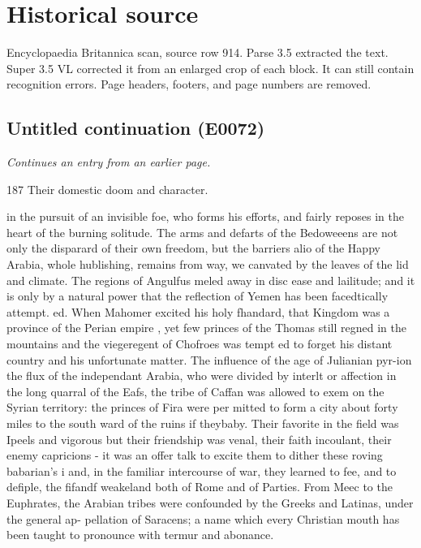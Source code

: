 \documentclass{article}
\begin{document}
\section*{Historical source}
Encyclopaedia Britannica scan, source row 914. Parse 3.5 extracted the text. Super 3.5 VL corrected it from an enlarged crop of each block. It can still contain recognition errors.
Page headers, footers, and page numbers are removed.

\subsection*{Untitled continuation (E0072)}
\textit{Continues an entry from an earlier page.}

187 Their domestic doom and character.

in the pursuit of an invisible foe, who forms his efforts, and fairly reposes in the heart of the burning solitude. The arms and defarts of the Bedoweeens are not only the disparard of their own freedom, but the barriers alio of the Happy Arabia, whole hublishing, remains from way, we canvated by the leaves of the lid and climate. The regions of Angulfus meled away in disc ease and lailitude; and it is only by a natural power that the reflection of Yemen has been facedtically attempt. ed. When Mahomer excited his holy fhandard, that Kingdom was a province of the Perian empire , yet few princes of the Thomas still regned in the mountains and the viegeregent of Chofroes was tempt ed to forget his distant country and his unfortunate matter. The influence of the age of Julianian pyr-ion the flux of the independant Arabia, who were divided by interlt or affection in the long quarral of the Eafs, the tribe of Caffan was allowed to exem on the Syrian territory: the princes of Fira were per mitted to form a city about forty miles to the south ward of the ruins if theybaby. Their favorite in the field was Ipeels and vigorous but their friendship was venal, their faith incoulant, their enemy capricions - it was an offer talk to excite them to dither these roving babarian's i and, in the familiar intercourse of war, they learned to fee, and to defiple, the fifandf weakeland both of Rome and of Parties. From Meec to the Euphrates, the Arabian tribes were confounded by the Greeks and Latinas, under the general ap- pellation of Saracens; a name which every Christian mouth has been taught to pronounce with termur and abonance.
\end{document}
